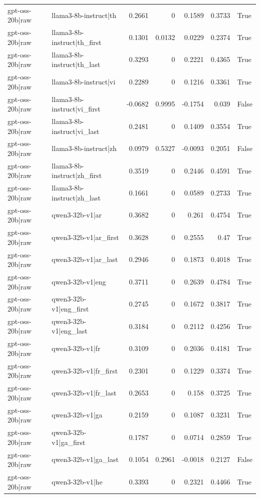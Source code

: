 \begin{table}
\begin{tabular}{l l r r r r l}
gpt-oss-20b|raw & llama3-8b-instruct|th & 0.2661 & 0 & 0.1589 & 0.3733 & True \\
gpt-oss-20b|raw & llama3-8b-instruct|th_first & 0.1301 & 0.0132 & 0.0229 & 0.2374 & True \\
gpt-oss-20b|raw & llama3-8b-instruct|th_last & 0.3293 & 0 & 0.2221 & 0.4365 & True \\
gpt-oss-20b|raw & llama3-8b-instruct|vi & 0.2289 & 0 & 0.1216 & 0.3361 & True \\
gpt-oss-20b|raw & llama3-8b-instruct|vi_first & -0.0682 & 0.9995 & -0.1754 & 0.039 & False \\
gpt-oss-20b|raw & llama3-8b-instruct|vi_last & 0.2481 & 0 & 0.1409 & 0.3554 & True \\
gpt-oss-20b|raw & llama3-8b-instruct|zh & 0.0979 & 0.5327 & -0.0093 & 0.2051 & False \\
gpt-oss-20b|raw & llama3-8b-instruct|zh_first & 0.3519 & 0 & 0.2446 & 0.4591 & True \\
gpt-oss-20b|raw & llama3-8b-instruct|zh_last & 0.1661 & 0 & 0.0589 & 0.2733 & True \\
gpt-oss-20b|raw & qwen3-32b-v1|ar & 0.3682 & 0 & 0.261 & 0.4754 & True \\
gpt-oss-20b|raw & qwen3-32b-v1|ar_first & 0.3628 & 0 & 0.2555 & 0.47 & True \\
gpt-oss-20b|raw & qwen3-32b-v1|ar_last & 0.2946 & 0 & 0.1873 & 0.4018 & True \\
gpt-oss-20b|raw & qwen3-32b-v1|eng & 0.3711 & 0 & 0.2639 & 0.4784 & True \\
gpt-oss-20b|raw & qwen3-32b-v1|eng_first & 0.2745 & 0 & 0.1672 & 0.3817 & True \\
gpt-oss-20b|raw & qwen3-32b-v1|eng_last & 0.3184 & 0 & 0.2112 & 0.4256 & True \\
gpt-oss-20b|raw & qwen3-32b-v1|fr & 0.3109 & 0 & 0.2036 & 0.4181 & True \\
gpt-oss-20b|raw & qwen3-32b-v1|fr_first & 0.2301 & 0 & 0.1229 & 0.3374 & True \\
gpt-oss-20b|raw & qwen3-32b-v1|fr_last & 0.2653 & 0 & 0.158 & 0.3725 & True \\
gpt-oss-20b|raw & qwen3-32b-v1|ga & 0.2159 & 0 & 0.1087 & 0.3231 & True \\
gpt-oss-20b|raw & qwen3-32b-v1|ga_first & 0.1787 & 0 & 0.0714 & 0.2859 & True \\
gpt-oss-20b|raw & qwen3-32b-v1|ga_last & 0.1054 & 0.2961 & -0.0018 & 0.2127 & False \\
gpt-oss-20b|raw & qwen3-32b-v1|he & 0.3393 & 0 & 0.2321 & 0.4466 & True \\

\end{tabular}
\end{table}
